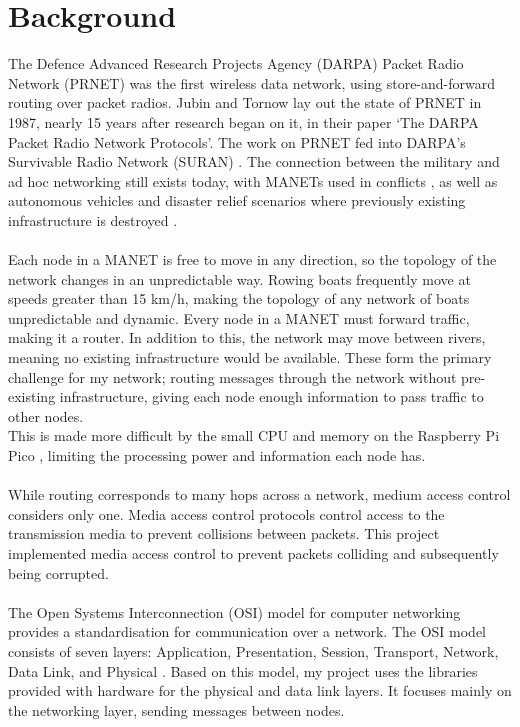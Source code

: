 \documentclass[12pt,a4paper]{report}
\begin{document}
\section{Background}
The Defence Advanced Research Projects Agency (DARPA) Packet Radio Network (PRNET) \cite{prnet} was the first wireless data network, using store-and-forward routing over packet radios. Jubin and Tornow lay out the state of PRNET in 1987, nearly 15 years after research began on it, in their paper `The DARPA Packet Radio Network Protocols'. The work on PRNET fed into DARPA's Survivable Radio Network (SURAN) \cite{suran}. The connection between the military and ad hoc networking still exists today, with MANETs used in conflicts \cite{military}, as well as autonomous vehicles \cite{vehicle} and disaster relief scenarios where previously existing infrastructure is destroyed \cite{disaster}. \\ \\
Each node in a MANET is free to move  in any direction, so the topology of the network changes in an unpredictable way. Rowing boats frequently move at speeds greater than 15 km/h, making the topology of any network of boats unpredictable and dynamic. Every node in a MANET must forward traffic, making it a router. In addition to this, the network may move between rivers, meaning no existing infrastructure would be available. These form the primary challenge for my network; routing messages through the network without pre-existing infrastructure, giving each node enough information to pass traffic to other nodes. \\
This is made more difficult by the small CPU and memory on the Raspberry Pi Pico \cite{rp2040}, limiting the processing power and information each node has.  \\ \\ 
While routing corresponds to many hops across a network, medium access control considers only one. Media access control protocols control access to the transmission media to prevent collisions between packets. This project implemented media access control to prevent packets colliding and subsequently being corrupted. \\ \\ 
The Open Systems Interconnection (OSI) model for computer networking provides a standardisation for communication over a network. The OSI model consists of seven layers: Application, Presentation, Session, Transport, Network, Data Link, and Physical \cite{ib}. Based on this model, my project uses the libraries provided with hardware for the physical and data link layers. It focuses mainly on the networking layer, sending messages between nodes.
\end{document}
